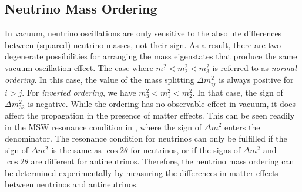 \subsection{Neutrino Mass Ordering}
In vacuum, neutrino oscillations are only sensitive to the absolute differences between (squared) neutrino masses, not their sign.
As a result, there are two degenerate possibilities for arranging the mass eigenstates that produce the same vacuum oscillation effect.
The case where $m^2_1 < m^2_2 < m^2_3$ is referred to as \emph{normal ordering}.
In this case, the value of the mass splitting $\Delta m^2_{ij}$ is always positive for $i>j$.
For \emph{inverted ordering}, we have $m^2_3 < m^2_1 < m^2_2$.
In that case, the sign of $\Delta m^2_{32}$ is negative.
While the ordering has no observable effect in vacuum, it does affect the propagation in the presence of matter effects.
This can be seen readily in the MSW resonance condition in , where the sign of $\Delta m^2$ enters the denominator.
The resonance condition for neutrinos can only be fulfilled if the sign of $\Delta m^2$ is the same as $\cos 2\theta$ for neutrinos, or if the signs of $\Delta m^2$ and $\cos 2\theta$ are different for antineutrinos.
Therefore, the neutrino mass ordering can be determined experimentally by measuring the differences in matter effects between neutrinos and antineutrinos.

